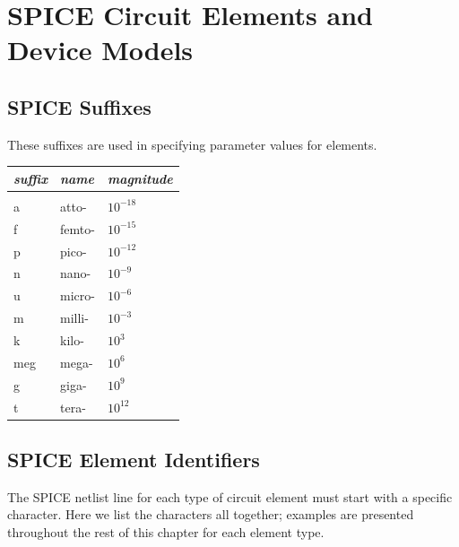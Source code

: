 \chapter{SPICE Circuit Elements and Device Models}

\label{chap_spicecircuitelementsanddevicemodels_sceadm}

\section{SPICE Suffixes}
\label{subsec_sceadm_suffixes}

These suffixes are used in specifying parameter values for elements.

\begin{tabular}{lll} 
\textit{suffix} & \textit{name} & \textit{magnitude} \\ \hline \\ \vspace{-0.8\parskip}
a & atto- & $10^{-18}$ \\
f & femto- & $10^{-15}$ \\
p & pico- & $10^{-12}$ \\
n & nano- & $10^{-9}$ \\
u & micro- & $10^{-6}$ \\
m & milli- & $10^{-3}$ \\
k & kilo- & $10^{3}$ \\
meg & mega- & $10^{6}$ \\
g & giga- & $10^{9}$ \\
t & tera- & $10^{12}$ \\
\end{tabular}

\clearpage

\section{SPICE Element Identifiers}
\label{subsec_sceadm_elementidentifiers}

The SPICE netlist line for each type of circuit element must start with a specific character.  Here we list the characters all together; examples are presented throughout the rest of this chapter for each element type.


